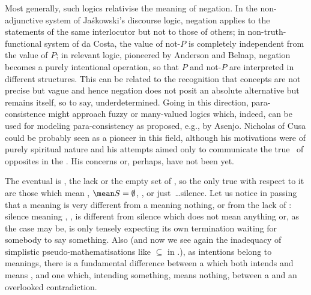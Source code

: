 {  Most generally, such logics relativise the meaning of negation. In the
  non-adjunctive system of Ja\'{s}kowski's discourse logic, negation applies to
  the statements of the same interlocutor but not to those of others; in
  non-truth-functional system of da Costa, the value of not-$P$ is completely
  independent from the value of $P$; in relevant logic, pioneered by Anderson
  and Belnap, negation becomes a purely intentional operation, so that $P$ and
  not-$P$ are interpreted in different structures. This can be related to the
  recognition that concepts are not precise but vague and hence negation does
  not posit an absolute alternative but remains itself, so to say,
  underdetermined.  Going in this direction, para-consistence might approach
  fuzzy or many-valued logics which, indeed, can be used for modeling
  para-consistency as proposed, e.g., by Asenjo.\label{ftnt:logicD} Nicholas of
  Cusa could be probably seen as a pioneer in this field, although his
  motivations were of purely spiritual nature and his attempts aimed only to
  communicate the true \equin\ of opposites in the . His
   concerns  or, perhaps, have not
  been  yet.}

\pa The eventual  is , the lack or the empty
set of , so the only  true with respect to it are
those which mean , $\mean S=\emptyset$, , 
or just~\ldots silence.  Let us notice in passing that a  meaning
 is very different from a  meaning nothing, or from the
lack of : silence meaning , ,
is different from silence which does not mean anything or, as the case may be,
is only tensely expecting its own termination waiting for somebody to say
something.
Also (and now we see again the inadequacy of simplistic pseudo-mathematisations
like $\subseteq$ in .), as intentions
belong to meanings, there is a fundamental difference between a  which
both intends and means , and one which, intending something,
means nothing, between a  and an overlooked contradiction.
 
